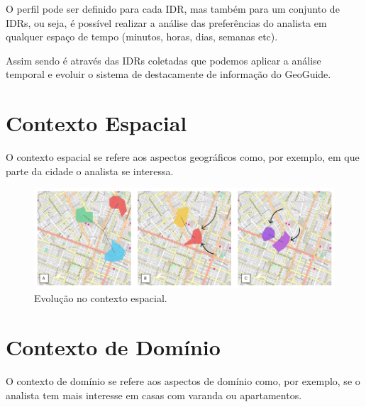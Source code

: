 O perfil pode ser definido para cada IDR, mas também para um conjunto de IDRs, ou seja, é possível realizar a análise das preferências do analista em qualquer espaço de tempo (minutos, horas, dias, semanas etc).

Assim sendo é através das IDRs coletadas que podemos aplicar a análise temporal e evoluir o sistema de destacamente de informação do GeoGuide.

\section{Contexto Espacial}

O contexto espacial se refere aos aspectos geográficos como, por exemplo, em que parte da cidade o analista se interessa.

\begin{figure}[t]
	\centering
	\includegraphics[width=\textwidth]{imagens/analise-contexto-espacial}
	\caption{Evolução no contexto espacial.}
	\label{fig:analise-contexto-espacial}
\end{figure}

\section{Contexto de Domínio}

O contexto de domínio se refere aos aspectos de domínio como, por exemplo, se o analista tem mais interesse em casas com varanda ou apartamentos.